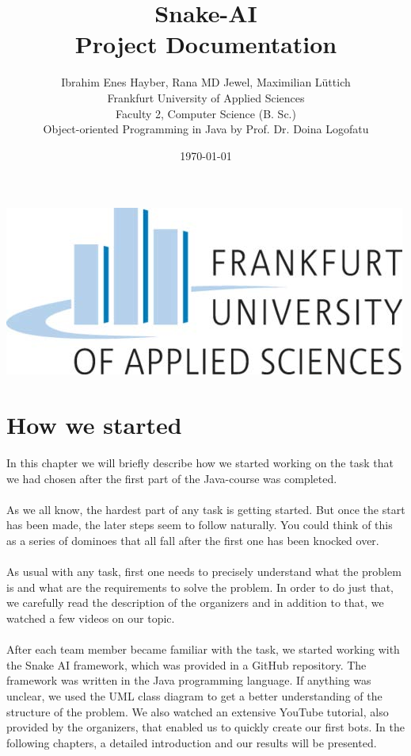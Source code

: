 \documentclass[a4paper,12pt]{article}
\title{Snake-AI\\Project Documentation}
\author{
		Ibrahim Enes Hayber, Rana MD Jewel, Maximilian Lüttich\\
		Frankfurt University of Applied Sciences\\
		Faculty 2, Computer Science (B. Sc.)\\
		Object-oriented Programming in Java by Prof. Dr. Doina Logofatu
}
\date{\today}
\begin{document}
\maketitle
\begin{center}
\includegraphics[scale=0.8]{fra-uas-logo}
\end{center}
\newpage
\tableofcontents

\newpage
\section{How we started}
In this chapter we will briefly describe how we started working on the task that we had chosen after the first part of the Java-course was completed.\\
\\As we all know, the hardest part of any task is getting started. But once the start has been made, the later steps seem to follow naturally.
You could think of this as  a series of dominoes that all fall after the first one has been knocked over.\\
\\As usual with any task, first one needs to precisely understand what the problem is and what are the requirements to solve the problem. In order to do just that, we carefully read the description of the organizers and in addition to that, we watched a few videos on our topic.\\
\\After each team member became familiar with the task, we started working with the Snake AI framework, which was provided in a GitHub repository. The framework was written in the Java programming language. If anything was unclear, we used the UML class diagram to get a better understanding of the structure of the problem. We also watched an extensive YouTube tutorial, also provided by the organizers, that enabled us to quickly create our first bots. In the following chapters, a detailed introduction and our results will be presented.
\newpage
\end{document}
